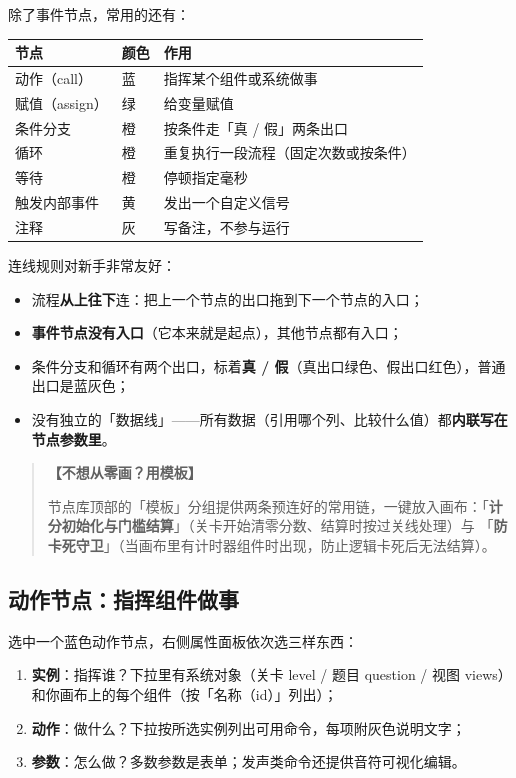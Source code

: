 \documentclass[UTF8,a4paper,zihao=-4]{ctexart}
\newcommand{\ui}[1]{「\textbf{#1}」}  %
\newenvironment{tip}[1][提示]{%
  \begin{quote}\small\textbf{【#1】}\ignorespaces
}{\end{quote}}
\begin{document}
除了事件节点，常用的还有：

\begin{center}
\begin{tabular}{lll}
\toprule
节点 & 颜色 & 作用 \\
\midrule
动作（call） & 蓝 & 指挥某个组件或系统做事 \\
赋值（assign） & 绿 & 给变量赋值 \\
条件分支 & 橙 & 按条件走「真 / 假」两条出口 \\
循环 & 橙 & 重复执行一段流程（固定次数或按条件） \\
等待 & 橙 & 停顿指定毫秒 \\
触发内部事件 & 黄 & 发出一个自定义信号 \\
注释 & 灰 & 写备注，不参与运行 \\
\bottomrule
\end{tabular}
\end{center}

连线规则对新手非常友好：

\begin{itemize}[nosep]
  \item 流程\textbf{从上往下}连：把上一个节点的出口拖到下一个节点的入口；
  \item \textbf{事件节点没有入口}（它本来就是起点），其他节点都有入口；
  \item 条件分支和循环有两个出口，标着\textbf{真 / 假}（真出口绿色、假出口红色），普通出口是蓝灰色；
  \item 没有独立的「数据线」——所有数据（引用哪个列、比较什么值）都\textbf{内联写在节点参数里}。
\end{itemize}

\begin{tip}[不想从零画？用模板]
节点库顶部的「模板」分组提供两条预连好的常用链，一键放入画布：\ui{计分初始化与门槛结算}（关卡开始清零分数、结算时按过关线处理）与 \ui{防卡死守卫}（当画布里有计时器组件时出现，防止逻辑卡死后无法结算）。
\end{tip}

\subsection{动作节点：指挥组件做事}

选中一个蓝色动作节点，右侧属性面板依次选三样东西：

\begin{enumerate}[nosep]
  \item \textbf{实例}：指挥谁？下拉里有系统对象（关卡 level / 题目 question / 视图 views）和你画布上的每个组件（按「名称（id）」列出）；
  \item \textbf{动作}：做什么？下拉按所选实例列出可用命令，每项附灰色说明文字；
  \item \textbf{参数}：怎么做？多数参数是表单；发声类命令还提供音符可视化编辑。
\end{enumerate}
\end{document}
